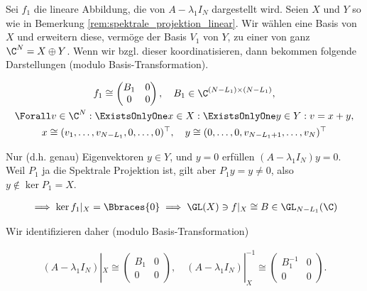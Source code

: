 \begin{remark} \label{semi_inverse}

    Sei $f_1$ die lineare Abbildung, die von $A - \lambda_1 I_N$ dargestellt wird.
    Seien $X$ und $Y$ so wie in Bemerkung \ref{rem:spektrale_projektion_linear}.
    Wir wählen eine Basis von $X$ und erweitern diese, vermöge der Basis $V_1$ von $Y$, zu einer von ganz $\C^N = X \oplus Y$.
    Wenn wir bzgl. dieser koordinatisieren, dann bekommen folgende Darstellungen (modulo Basis-Transformation).

    \begin{gather*}
        f_1
        \cong
        \begin{pmatrix}
            B_1 & 0 \\
            0   & 0
        \end{pmatrix},
        \quad
        B_1 \in \C^{(N - L_1) \times (N - L_1)}, \\
        \Forall v \in \C^N:
            \ExistsOnlyOne x \in X:
            \ExistsOnlyOne y \in Y:
                v = x + y, \\
        x
        \cong
        (
            v_1, \dots, v_{N - L_1},
            0, \dots, 0
        )^\top,
        \quad
        y
        \cong
        (
            0, \dots, 0,
            v_{N - L_1 + 1}, \dots, v_N
        )^\top
    \end{gather*}

    Nur (d.h. genau) Eigenvektoren $y \in Y$, und $y = 0$ erfüllen $(A - \lambda_1 I_N) y = 0$.
    Weil $P_1$ ja die Spektrale Projektion ist, gilt aber $P_1 y = y \neq 0$, also $y \not \in \ker P_1 = X$.

    \begin{align*}
        \implies
        \ker f_1 |_X = \Bbraces{0}
        \implies
        \GL(X) \ni f |_X \cong B \in \GL_{N - L_1}(\C)
    \end{align*}

    Wir identifizieren daher (modulo Basis-Transformation)

    \begin{align*}
        (A - \lambda_1 I_N) |_X
        \cong
        \begin{pmatrix}
            B_1 & 0 \\ 0 & 0
        \end{pmatrix},
        \quad
        (A - \lambda_1 I_N) |_X^{-1}
        \cong
        \begin{pmatrix}
            B_1^{-1} & 0 \\ 0 & 0
        \end{pmatrix}.
    \end{align*}

\end{remark}